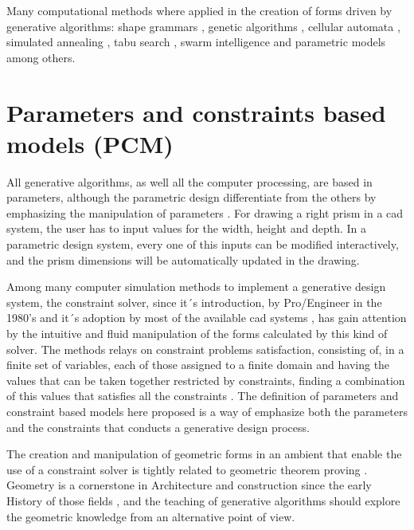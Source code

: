 \documentclass[preprint,12pt,3p]{elsarticle}
\begin{document}
Many computational methods where applied in the creation of  forms driven by generative algorithms: shape grammars \cite{stiny1972} \cite{Stiny1978} \cite{duarte2005} \cite{tepavcevic2012}, genetic algorithms \cite{caldas1999} \cite{fasoulaki2008} \cite{Troiano2012} \cite{Caldas2002}, cellular automata  \cite{Herr2007}, simulated annealing \cite{Ceranic2001} \cite{Correia2001} \cite{Lamberti2008}, tabu search \cite{Bland1991}, swarm intelligence \cite{Luh2011} \cite{Yahya2014} and parametric models \cite{Turrin2011} \cite{Fischer2005} \cite{lachauer2011a} \cite{Milena2010a} among others.

\section{Parameters and constraints based models (PCM)}
\label{ParamConst}

All generative algorithms, as well all the computer processing, are based in parameters, although the parametric design differentiate from the others by emphasizing the manipulation of parameters \cite{DIno2012}. For drawing a right prism in a cad system, the user has to input values for the width, height and depth. In a parametric design system, every one of this inputs can be modified interactively, and the prism dimensions will be automatically updated in the drawing.

Among many computer simulation methods to implement a generative design system, the constraint solver, since it´s introduction, by Pro/Engineer in the 1980's and it´s adoption by most of the available cad systems \cite{Hoffmann2005}, has gain attention by the intuitive and fluid manipulation of the forms calculated by this kind of solver. The methods relays on constraint problems satisfaction, consisting of, in a finite set of variables, each of those assigned to a finite domain and having the values that can be taken together restricted by constraints, finding a combination of this values that satisfies all the constraints \cite{Bartk01theoryand}. The definition of parameters and constraint based models here proposed is a way of emphasize both the parameters and the constraints that conducts a generative design process. 

The creation and manipulation of geometric forms in an ambient that enable the use of a constraint solver is tightly related to geometric theorem proving \cite{Hoffmann2005}. Geometry is a cornerstone in Architecture and construction since the early History of those fields \cite{ceccato2010mbg}, and the teaching of generative algorithms should explore the geometric knowledge from an alternative point of view.  
\end{document}
